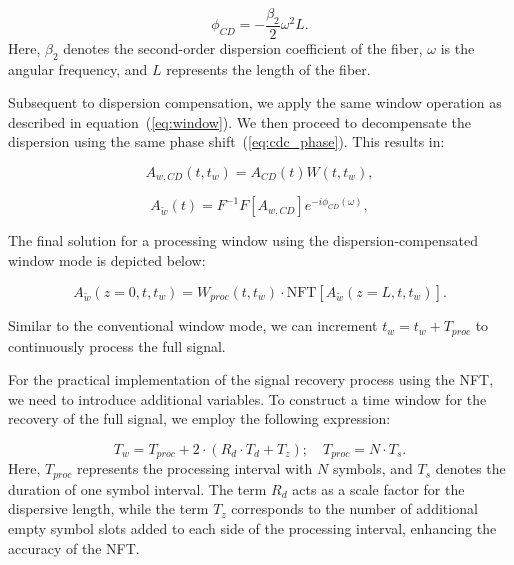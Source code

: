 \begin{equation}
\phi_{CD} = -\frac{\beta_2}{2} \omega^2 L {.}
\label{eq:cdc_phase}
\end{equation}
%
Here, $\beta_2$ denotes the second-order dispersion coefficient of the fiber, $\omega$ is the angular frequency, and $L$ represents the length of the fiber.

Subsequent to dispersion compensation, we apply the same window operation as described in equation~(\ref{eq:window}). We then proceed to decompensate the dispersion using the same phase shift~(\ref{eq:cdc_phase}). This results in:

\begin{equation}
A_{w, CD}(t, t_w) = A_{CD}(t) W(t, t_w) {,}
\end{equation}

\begin{equation}
A_{\tilde{w}}(t) = F^{-1}F[A_{w, CD}]e^{-i\phi_{CD}(\omega)} {,}
\end{equation}

The final solution for a processing window using the dispersion-compensated window mode is depicted below:

\begin{equation}
A_{\tilde{w}}(z = 0, t, t_w) = W_{proc}(t, t_w) \cdot \mathrm{NFT}[A_{\tilde{w}}(z = L, t, t_w)] {.}
\end{equation}

Similar to the conventional window mode, we can increment $t_w = t_w + T_{proc}$ to continuously process the full signal.

For the practical implementation of the signal recovery process using the NFT, we need to introduce additional variables. To construct a time window for the recovery of the full signal, we employ the following expression:

\begin{equation}
T_w = T_{proc} + 2 \cdot (R_d \cdot T_d + T_z) {;} \quad T_{proc} = N \cdot T_s {.}
\end{equation}
%
Here, $T_{proc}$ represents the processing interval with $N$ symbols, and $T_s$ denotes the duration of one symbol interval. The term $R_d$ acts as a scale factor for the dispersive length, while the term $T_z$ corresponds to the number of additional empty symbol slots added to each side of the processing interval, enhancing the accuracy of the NFT.

